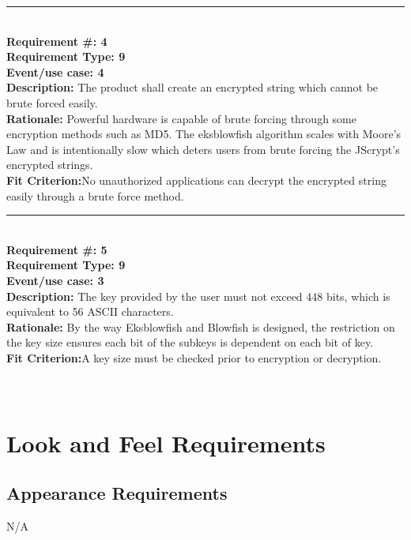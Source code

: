 \documentclass[12pt]{article}
\begin{document}
	\noindent\rule{12cm}{0.4pt} \\

	\noindent\textbf{Requirement \#: 4}\\
	\textbf{Requirement Type: 9	}\\
	\textbf{Event/use case: 4}\\
	\textbf{Description:} The product shall create an encrypted string which cannot be brute forced easily.\\
	\textbf{Rationale:}  Powerful hardware is capable of brute forcing through some encryption methods such as MD5. The eksblowfish algorithm scales with Moore’s Law and is intentionally slow which deters users from brute forcing the JScrypt’s encrypted strings.\\
	\textbf{Fit Criterion:}No unauthorized applications can decrypt the encrypted string easily through a brute force method.\\

	\noindent\rule{12cm}{0.4pt} \\

	\noindent\textbf{Requirement \#: 5}\\
	\textbf{Requirement Type: 9	}\\
	\textbf{Event/use case: 3 }\\
	\textbf{Description:} The key provided by the user must not exceed 448 bits, which is equivalent to 56 ASCII characters.\\
	\textbf{Rationale:} By the way Eksblowfish and Blowfish is designed, the restriction on the key size ensures each bit of the subkeys is dependent on each bit of key.\\
	\textbf{Fit Criterion:}A key size must be checked prior to encryption or decryption.\\ \\ \\



	

	
\section*{}

\section {Look and Feel Requirements}

\subsection {Appearance Requirements}
N/A
\end{document}
